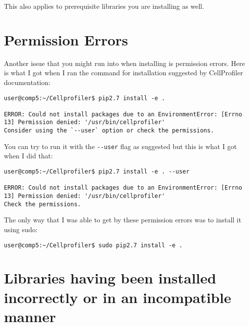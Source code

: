 \documentclass[
  letterpaper,
  DIV=11,
  numbers=noendperiod]{scrreprt}
\begin{document}
This also applies to prerequisite libraries you are installing as well.

\hypertarget{permission-errors}{%
\section*{\texorpdfstring{\textbf{Permission
Errors}}{Permission Errors}}\label{permission-errors}}


Another issue that you might run into when installing is permission
errors. Here is what I got when I ran the command for installation
suggested by CellProfiler documentation:

\begin{verbatim}
user@comp5:~/Cellprofiler$ pip2.7 install -e .

ERROR: Could not install packages due to an EnvironmentError: [Errno 13] Permission denied: '/usr/bin/cellprofiler'
Consider using the `--user` option or check the permissions.
\end{verbatim}

You can try to run it with the \texttt{-\/-user} flag as suggested but
this is what I got when I did that:

\begin{verbatim}
user@comp5:~/Cellprofiler$ pip2.7 install -e . --user

ERROR: Could not install packages due to an EnvironmentError: [Errno 13] Permission denied: '/usr/bin/cellprofiler'
Check the permissions.
\end{verbatim}

The only way that I was able to get by these permission errors was to
install it using sudo:

\begin{verbatim}
user@comp5:~/Cellprofiler$ sudo pip2.7 install -e .
\end{verbatim}

\hypertarget{libraries-having-been-installed-incorrectly-or-in-an-incompatible-manner}{%
\section*{\texorpdfstring{\textbf{Libraries having been installed
incorrectly or in an incompatible
manner}}{Libraries having been installed incorrectly or in an incompatible manner}}\label{libraries-having-been-installed-incorrectly-or-in-an-incompatible-manner}}
\end{document}

